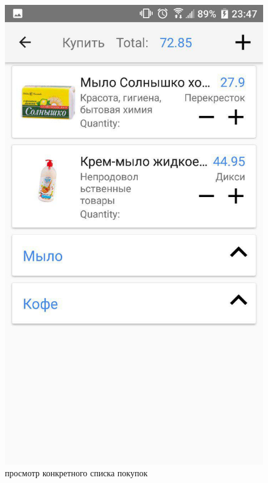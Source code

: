 \begin{figure}[h!]
    \centering
    \includegraphics[height=0.38\textheight]{./screenshots/3/shoplist.jpg}
    \caption{\small{просмотр конкретного списка покупок}}
    \endminipage\hfill

\end{figure}
